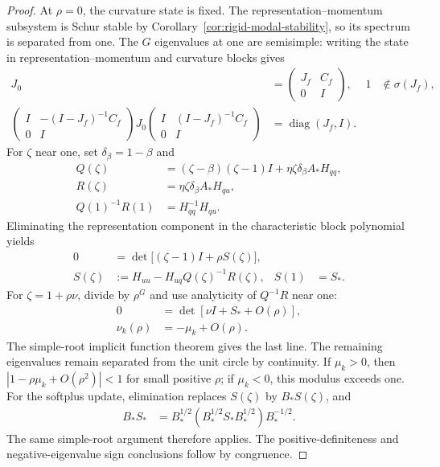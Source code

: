 \begin{proof}
At $\rho=0$, the curvature state is fixed. The representation--momentum subsystem is Schur stable by Corollary~\ref{cor:rigid-modal-stability}, so its spectrum is separated from one. The $G$ eigenvalues at one are semisimple: writing the state in representation--momentum and curvature blocks gives
\begin{align}
 J_0&=\begin{pmatrix}J_f&C_f\\0&I\end{pmatrix},&1&\notin\sigma(J_f),\\
 \begin{pmatrix}I&-(I-J_f)^{-1}C_f\\0&I\end{pmatrix}
 J_0
 \begin{pmatrix}I&(I-J_f)^{-1}C_f\\0&I\end{pmatrix}
 &=\operatorname{diag}(J_f,I).
\end{align}
For $\zeta$ near one, set $\delta_\beta=1-\beta$ and
\begin{align}
 Q(\zeta)&=(\zeta-\beta)(\zeta-1)I+\eta\zeta\delta_\beta A_*H_{qq},\\
 R(\zeta)&=\eta\zeta\delta_\beta A_*H_{qu},\\
 Q(1)^{-1}R(1)&=H_{qq}^{-1}H_{qu}.
\end{align}
Eliminating the representation component in the characteristic block polynomial yields
\begin{align}
 0&=\det\bigl[(\zeta-1)I+\rho S(\zeta)\bigr],\\
 S(\zeta)&:=H_{uu}-H_{uq}Q(\zeta)^{-1}R(\zeta),&S(1)&=S_*.
\end{align}
For $\zeta=1+\rho\nu$, divide by $\rho^G$ and use analyticity of $Q^{-1}R$ near one:
\begin{align}
 0&=\det[\nu I+S_*+O(\rho)],\\
 \nu_k(\rho)&=-\mu_k+O(\rho).
\end{align}
The simple-root implicit function theorem gives the last line. The remaining eigenvalues remain separated from the unit circle by continuity. If $\mu_k>0$, then $|1-\rho\mu_k+O(\rho^2)|<1$ for small positive $\rho$; if $\mu_k<0$, this modulus exceeds one. For the softplus update, elimination replaces $S(\zeta)$ by $B_*S(\zeta)$, and
\begin{align}
 B_*S_*&=B_*^{1/2}(B_*^{1/2}S_*B_*^{1/2})B_*^{-1/2}.
\end{align}
The same simple-root argument therefore applies. The positive-definiteness and negative-eigenvalue sign conclusions follow by congruence.
\end{proof}

